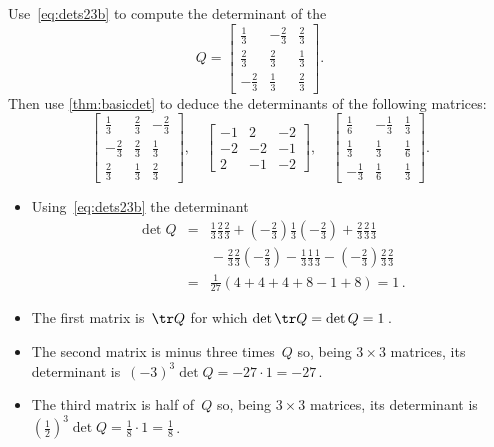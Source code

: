 \begin{example} 
Use~\eqref{eq:dets23b} to compute the determinant of the 
\begin{equation*}
Q=\begin{bmatrix} \frac13&-\frac23&\frac23
\\\frac23&\frac23&\frac13
\\-\frac23&\frac13&\frac23 \end{bmatrix}.
\end{equation*}
Then use \autoref{thm:basicdet} to deduce the determinants of the following matrices:
\begin{equation*}
\begin{bmatrix} \frac13&\frac23&-\frac23
\\-\frac23&\frac23&\frac13
\\\frac23&\frac13&\frac23 \end{bmatrix}
,\quad
\begin{bmatrix} -1&2&-2
\\-2&-2&-1
\\2&-1&-2 \end{bmatrix}
,\quad
\begin{bmatrix} \frac16&-\frac13&\frac13
\\\frac13&\frac13&\frac16
\\-\frac13&\frac16&\frac13 \end{bmatrix}.
\end{equation*}

\begin{solution} 
\begin{itemize}
\item Using~\eqref{eq:dets23b} the determinant
\begin{eqnarray*}
\det Q&=&\tfrac13\tfrac23\tfrac23+(-\tfrac23)\tfrac13(-\tfrac23)
+\tfrac23\tfrac23\tfrac13
\\&&{}-\tfrac23\tfrac23(-\tfrac23)
-\tfrac13\tfrac13\tfrac13-(-\tfrac23)\tfrac23\tfrac23
\\&=&\tfrac1{27}(4+4+4+8-1+8)=1\,.
\end{eqnarray*}

\item The first matrix is~\(\tr Q\) for which \(\det\tr Q=\det Q=1\)\,.

\item The second matrix is minus three times~\(Q\) so, being \(3\times3\) matrices, its determinant is~\((-3)^3\det Q=-27\cdot1=-27\)\,.

\item The third matrix is half of~\(Q\) so, being \(3\times3\) matrices, its determinant is~\((\tfrac12)^3\det Q=\frac18\cdot1=\frac18\)\,.
\end{itemize}
\end{solution}
\end{example}




